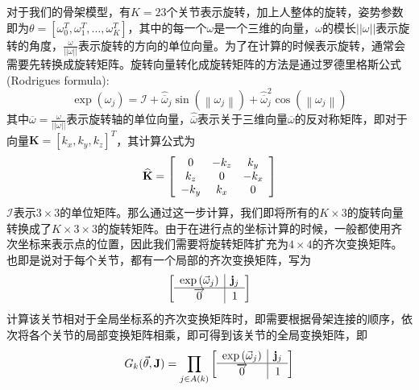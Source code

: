 对于我们的骨架模型，有\(K=23\)个关节表示旋转，加上人整体的旋转，姿势参数即为\(\theta = [\omega_0^T, \omega_1^T, \ldots, \omega_K^T]\)，其中的每一个\(\omega\)是一个三维的向量，\(\omega\)的模长\(||\omega||\)表示旋转的角度，\(\frac{\omega}{||\omega||}\)表示旋转的方向的单位向量。为了在计算的时候表示旋转，通常会需要先转换成旋转矩阵。旋转向量转化成旋转矩阵的方法是通过罗德里格斯公式(Rodrigues formula):
\begin{equation}
    \exp \left(  \omega  _ { j } \right) = \mathcal { I } + \widehat { \overline { \omega }} _ { j } \sin \left( \left\|  \omega  _ { j } \right\| \right) + \widehat { \overline { \omega } } _ { j } ^ { 2 } \cos \left( \left\| \omega_ { j } \right\| \right)
\end{equation}
其中\(\overline { \omega } = \frac{\omega}{||\omega||}\)表示旋转轴的单位向量，\(\widehat { \overline { \omega }}\)表示关于三维向量\(\overline{\omega}\)的反对称矩阵，即对于向量\(\mathbf{K} = [k_x, k_y, k_z]^T\)，其计算公式为
\begin{equation}
\widehat{\mathbf { K }} = \left[ \begin{array} { c c c } { 0 } & { - k _ { z } } & { k _ { y } } \\ { k _ { z } } & { 0 } & { - k _ { x } } \\ { - k _ { y } } & { k _ { x } } & { 0 } \end{array} \right]
\end{equation}
\(\mathcal { I }\)表示\(3\times 3\)的单位矩阵。那么通过这一步计算，我们即将所有的\(K \times 3\)的旋转向量转换成了\(K\times 3 \times 3\)的旋转矩阵。由于在进行点的坐标计算的时候，一般都使用齐次坐标来表示点的位置，因此我们需要将旋转矩阵扩充为\(4\times 4\)的齐次变换矩阵。也即是说对于每个关节，都有一个局部的齐次变换矩阵，写为
\begin{equation}
\left[ \begin{array} { c | c } { \exp \left( \vec { \omega } _ { j } \right) } & { \mathbf { j } _ { j } } \\ \hline \overrightarrow { 0 } & { 1 } \end{array} \right]
\end{equation}
计算该关节相对于全局坐标系的齐次变换矩阵时，即需要根据骨架连接的顺序，依次将各个关节的局部变换矩阵相乘，即可得到该关节的全局变换矩阵，即
\begin{equation}
    G _ { k } ( \vec { \theta } , \mathbf { J } ) = \prod _ { j \in A ( k ) } \left[ \begin{array} { c | c } { \exp \left( \vec { \omega } _ { j } \right) } & { \mathbf { j } _ { j } } \\ \hline \overrightarrow { 0 } & { 1 } \end{array} \right]
\end{equation}
